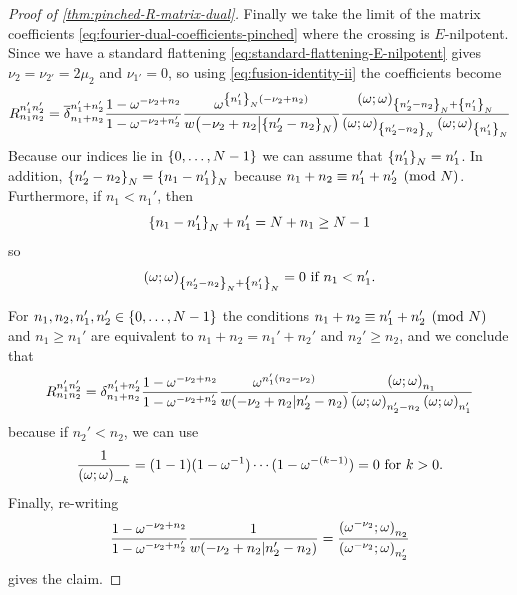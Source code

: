 \documentclass{sl2ams}
\numberwithin{equation}{section}
\begin{document}
\begin{proof}[Proof of \cref{thm:pinched-R-matrix-dual}]
  Finally we take the limit of the matrix coefficients \eqref{eq:fourier-dual-coefficients-pinched} where the crossing is \(E\)-nilpotent.
  Since we have a standard flattening \eqref{eq:standard-flattening-E-nilpotent} gives \(\nu_{2} = \nu_{2'}  = 2 \mu_{2}\) and \(\nu_{1'} = 0\), so using \cref{eq:fusion-identity-ii} the coefficients become
  \begin{align*}
    R_{n_{1} n_{2}}^{n_{1}' n_{2}'}
    =
    \nrdel{n_1 + n_2}{n_1' +  n_2'}
    \frac{
      1- \omega^{-\nu_{2} + n_{2}}
      }{
      1- \omega^{-\nu_{2} + n_{2}'}
    }
    \frac{
      \omega^{ \modb{n_{1}'}(-\nu_{2} + n_{2})}
    }{
      \qlog{-\nu_{2} + n_{2}}{ \modb{n_{2}' - n_{2}} }
    }
    \frac{
      \qp{\omega}{\modb{n_2' - n_2} + \modb{n_1'}}
    }{
      \qp{\omega}{\modb{n_2' - n_2}}
      \qp{\omega}{\modb{n_1'}}
    }
  \end{align*}
  Because our indices lie in \(\set{0, \dots, \nr -1}\) we can assume that \(\left\{n_1'\right\}_{N} = n_1'\).
  In addition, \(\left\{n_2' - n_2\right\}_{N} = \left\{n_1 - n_1'\right\}_{N}\) because \(n_1 + n_2 \equiv n_1' + n_2' \pmod {N}\).
  Furthermore, if \(n_1 < n_1'\), then
  \[
    \left\{n_1 - n_1'\right\}_{N} + n_1' = N + n_1 \ge N - 1
  \]
  so
  \[
    \qp{\omega}{\modb{n_2' - n_2} + \modb{n_1'}} = 0
    \text{ if }
    n_1 < n_1'.
  \]

  For \(n_1, n_2, n_1', n_2' \in \set{0, \dots, \nr -1}\) the conditions \(n_1 + n_2 \equiv n_1' + n_2' \pmod {N}\) and \(n_1 \ge n_1'\) are equivalent to \(n_1 + n_2 = n_1' + n_2'\) and \(n_2' \ge n_2\), and we conclude that
  \begin{align*}
    R_{n_{1} n_{2}}^{n_{1}' n_{2}'}
    =
    \del{n_1 + n_2}{n_1' +  n_2'}
    \frac{
      1- \omega^{-\nu_{2} + n_{2}}
      }{
      1- \omega^{-\nu_{2} + n_{2}'}
    }
    \frac{
      \omega^{ n_{1}'(n_{2} - \nu_{2})}
    }{
      \qlog{-\nu_{2} + n_{2}}{ n_{2}' - n_{2} }
    }
    \frac{
      \qp{\omega}{n_{1}}
    }{
      \qp{\omega}{n_2' - n_2}
      \qp{\omega}{n_1'}
    }
  \end{align*}
  because if \(n_2' < n_2\), we can use
  \[
    \frac{1}{\qp{\omega}{-k}} = (1 - 1) (1 - \omega^{-1}) \cdots (1 - \omega^{-(k-1)}) = 0 \text{ for } k > 0.
  \]
  Finally, re-writing
  \begin{align*}
    \frac{
      1 - \omega^{-\nu_2 + n_2}
    }{
      1 - \omega^{-\nu_2 +  n_2'}
    }
    \frac{
      1
    }{
      \qlog{-\nu_2 + n_2}{n_2' - n_2}
    }
    =
    \frac{
      \qp{\omega^{-\nu_2}}{n_2}
    }{
      \qp{\omega^{-\nu_2}}{n_2'}
    }
  \end{align*}
  gives the claim.
\end{proof}
\end{document}
